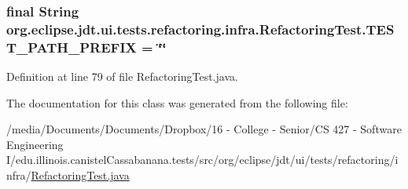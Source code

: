 \hypertarget{classorg_1_1eclipse_1_1jdt_1_1ui_1_1tests_1_1refactoring_1_1infra_1_1RefactoringTest_acd2df0f1993be4d7c6010f0523df987e}{
\subsubsection[{TEST\_\-PATH\_\-PREFIX}]{\setlength{\rightskip}{0pt plus 5cm}final String {\bf org.eclipse.jdt.ui.tests.refactoring.infra.RefactoringTest.TEST\_\-PATH\_\-PREFIX} = \char`\"{}\char`\"{}}}
\label{classorg_1_1eclipse_1_1jdt_1_1ui_1_1tests_1_1refactoring_1_1infra_1_1RefactoringTest_acd2df0f1993be4d7c6010f0523df987e}


Definition at line 79 of file RefactoringTest.java.



The documentation for this class was generated from the following file:\begin{DoxyCompactItemize}
\item 
/media/Documents/Documents/Dropbox/16 -\/ College -\/ Senior/CS 427 -\/ Software Engineering I/edu.illinois.canistelCassabanana.tests/src/org/eclipse/jdt/ui/tests/refactoring/infra/\hyperlink{RefactoringTest_8java}{RefactoringTest.java}\end{DoxyCompactItemize}
